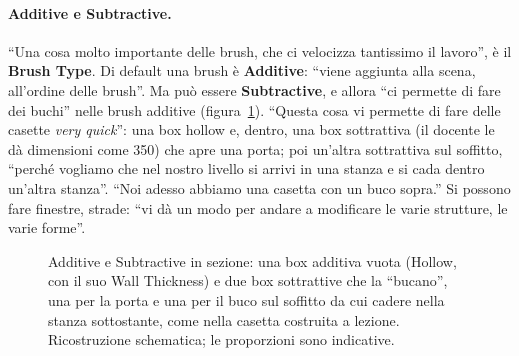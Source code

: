 \paragraph{Additive e Subtractive.} ``Una cosa molto importante delle brush, che ci
velocizza tantissimo il lavoro'', è il \textbf{Brush Type}. Di default una brush è
\textbf{Additive}: ``viene aggiunta alla scena, all'ordine delle brush''. Ma può essere
\textbf{Subtractive}, e allora ``ci permette di fare dei buchi'' nelle brush additive
(figura~\ref{ue13:fig:csg}). ``Questa cosa vi permette di fare delle casette \emph{very
quick}'': una box hollow e, dentro, una box sottrattiva (il docente le dà dimensioni come
350) che apre una porta; poi un'altra sottrattiva sul soffitto, ``perché vogliamo che nel
nostro livello si arrivi in una stanza e si cada dentro un'altra stanza''. ``Noi adesso
abbiamo una casetta con un buco sopra.'' Si possono fare finestre, strade: ``vi dà un modo
per andare a modificare le varie strutture, le varie forme''.

\begin{figure}[htbp]
\centering
{}
\caption{Additive e Subtractive in sezione: una box additiva vuota (Hollow, con il suo
Wall Thickness) e due box sottrattive che la ``bucano'', una per la porta e una per il
buco sul soffitto da cui cadere nella stanza sottostante, come nella casetta costruita a
lezione. Ricostruzione schematica; le proporzioni sono indicative.}
\label{ue13:fig:csg}
\end{figure}

